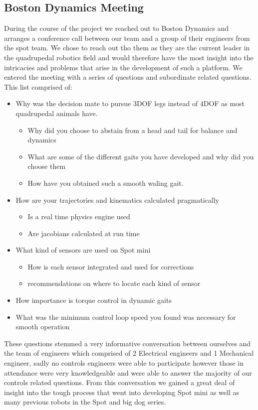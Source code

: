     \subsection{Boston Dynamics Meeting} %
        During the course of the project we reached out to Boston Dynamics and arranges a conference call between our team and a group of their engineers from the spot team. We chose to reach out tho them as they are the current leader in the quadrupedal robotics field and would therefore have the most insight into the intricacies and problems that arise in the development of such a platform. We entered the meeting with a series of questions and subordinate related questions. This list comprised of:
        \begin{itemize}
            \item Why was the decision mate to pursue 3DOF legs instead of 4DOF as most quadrupedal animals have. 
            \begin{itemize}
                \item Why did you choose to abstain from a head and tail for balance and dynamics
                \item What are some of the different gaits you have developed and why did you choose them
                \item How have you obtained such a smooth waling gait.
            \end{itemize}
            \item How are your trajectories and kinematics calculated pragmatically
                \begin{itemize}
                    \item Is a real time physics engine used
                    \item Are jacobians calculated at run time
                \end{itemize}
            \item What kind of sensors are used on Spot mini
                \begin{itemize}
                    \item How is each sensor integrated and used for corrections
                    \item recommendations on where to locate each kind of sensor
                \end{itemize}
            \item How importance is torque control in dynamic gaits
            \item What was the minimum control loop speed you found was necessary for smooth operation
        \end{itemize}
        These questions stemmed a very informative conversation between ourselves and the team of engineers which comprised of 2 Electrical engineers and 1 Mechanical engineer, sadly no controls engineers were able to participate however those in attendance were very knowledgeable and were able to answer the majority of our controls related questions. From this conversation we gained a great deal of insight into the tough process that went into developing Spot mini as well as many previous robots in the Spot and big dog series. 

